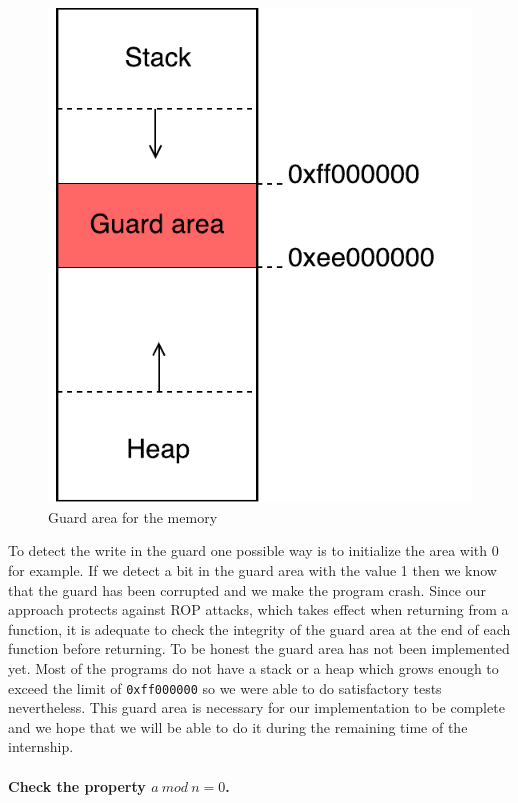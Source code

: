 \documentclass[11pt]{sdm}
\begin{document}
\begin{figure}[!ht]
\centering
\includegraphics[scale=0.6]{images/guard.pdf}
\caption{Guard area for the memory}
\label{guard}
\end{figure}

To detect the write in the guard one possible way is to initialize the area with 0 for example. If we detect a bit in the guard area with the value 1 then we know that the guard has been corrupted and we make the program crash. Since our approach protects against ROP attacks, which takes effect when returning from a function, it is adequate to check the integrity of the guard area at the end of each function before returning.
To be honest the guard area has not been implemented yet. Most of the programs do not have a stack or a heap which grows enough to exceed the limit of \texttt{0xff000000} so we were able to do satisfactory tests nevertheless. This guard area is necessary for our implementation to be complete and we hope that we will be able to do it during the remaining time of the internship.

\paragraph{Check the property $a~mod~n=0$.}
\label{par:Classic check}
 
\end{document}
